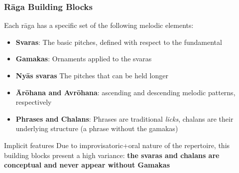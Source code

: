 \documentclass[hyperref={pdfpagelabels=false}]{beamer}
\begin{document}
     \begin{frame}
       \frametitle{R\=aga Building Blocks}
       Each r\=aga has a specific set of the following melodic elements:
       \vspace{2mm}
       \begin{itemize}
       \item \textbf{Svaras}: The basic pitches, defined with respect to the fundamental
       \item \textbf{Gamakas}: Ornaments applied to the svaras
       \item \textbf{Ny\=as svaras} The pitches that can be held longer
       \item \textbf{\=Ar\=ohana and Avr\=ohana}: ascending and descending melodic patterns, respectively
       \item \textbf{Phrases and Chalans}: Phrases are traditional {\it licks}, chalans are their underlying structure (a phrase without the gamakas)
       \end{itemize}

       \begin{alertblock}{Implicit features}
         Due to improvisatoric+oral nature of the repertoire, this building blocks present a high variance: \textbf{the svaras and chalans are conceptual and never appear without Gamakas}
       \end{alertblock}
     \end{frame}
\end{document}
